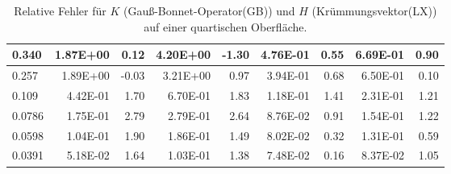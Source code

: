 \begin{table}[htbp]
\begin{tabular}{|l|r|r|r|r|r|r|r|r|}
            0.340 & 1.87E+00 & 0.12 & 4.20E+00 & -1.30 & 4.76E-01 & 0.55 & 6.69E-01 & 0.90 \\ \hline
            0.257 & 1.89E+00 & -0.03 & 3.21E+00 & 0.97 & 3.94E-01 & 0.68 & 6.50E-01 & 0.10 \\ \hline
            0.109 & 4.42E-01 & 1.70 & 6.70E-01 & 1.83 & 1.18E-01 & 1.41 & 2.31E-01 & 1.21 \\ \hline
            0.0786 & 1.75E-01 & 2.79 & 2.79E-01 & 2.64 & 8.76E-02 & 0.91 & 1.54E-01 & 1.22 \\ \hline
            0.0598 & 1.04E-01 & 1.90 & 1.86E-01 & 1.49 & 8.02E-02 & 0.32 & 1.31E-01 & 0.59 \\ \hline
            0.0391 & 5.18E-02 & 1.64 & 1.03E-01 & 1.38 & 7.48E-02 & 0.16 & 8.37E-02 & 1.05 \\ \hline
      \end{tabular}
      \caption[Gauß-Bonnet und Krümmungsvektor auf einer quartischen Oberfläche]{Relative Fehler für \( K \) (Gauß-Bonnet-Operator(GB))
      und \( H \) (Krümmungsvektor(LX)) auf einer quartischen Oberfläche.}
      \label{tabHeineBGBLX}
   \end{table}

